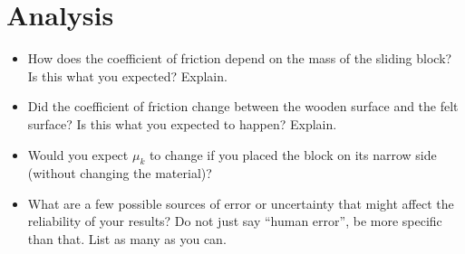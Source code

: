 \documentclass{article}
\begin{document}
\section*{Analysis}
\begin{itemize}
	\item How does the coefficient of friction depend on the mass of the sliding block? Is this what you expected? Explain.
	\item Did the coefficient of friction change between the wooden surface and the felt surface? Is this what you expected to happen? Explain.
	\item Would you expect $\mu_k$ to change if you placed the block on its narrow side (without changing the material)?
	\item What are a few possible sources of error or uncertainty that might affect the reliability of your results? Do not just say ``human error'', be more specific than that. List as many as you can.
\end{itemize}
\end{document}
